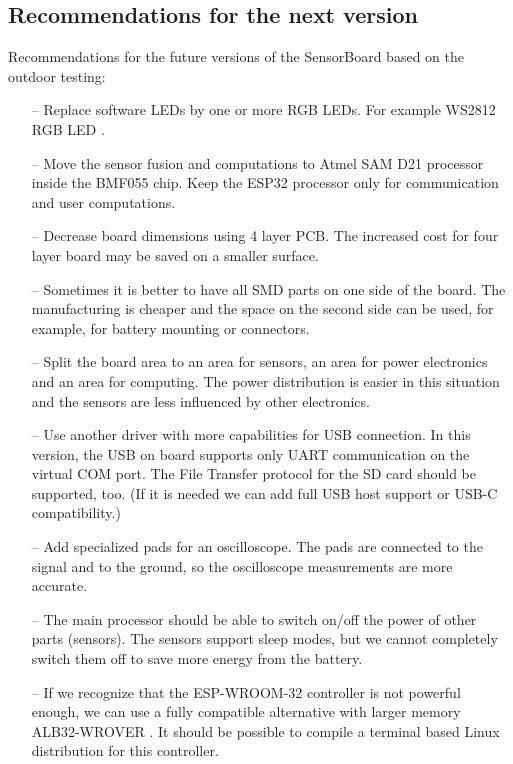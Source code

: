 \subsection{Recommendations for the next version}
\label{recommendationsNextVerison}
Recommendations for the future versions of the SensorBoard based on the outdoor testing:
\begin{itemize}
    \item[--] Replace software LEDs by one or more RGB LEDs. For example WS2812 RGB LED \cite{worldsemi:WS2812}.
    \item[--] Move the sensor fusion and computations to Atmel SAM D21 \cite{atmel:samd20} processor inside the BMF055 \cite{bosch:BMF055} chip. Keep the ESP32 \cite{espressif:ESP-WROOM-32} processor only for communication and user computations.
    \item[--] Decrease board dimensions using 4 layer \ac{PCB}. The increased cost for four layer board may be saved on a smaller surface.
    \item[--] Sometimes it is better to have all \ac{SMD} parts on one side of the board. The manufacturing is cheaper and the space on the second side can be used, for example, for battery mounting or connectors.
    \item[--] Split the board area to an area for sensors, an area for power electronics and an area for computing. The power distribution is easier in this situation and the sensors are less influenced by other electronics.
    \item[--] Use another driver with more capabilities for USB connection. In this version, the USB on board supports only UART communication on the virtual COM port. The File Transfer protocol for the SD card should be supported, too. (If it is needed we can add full USB host support or USB-C compatibility.)
    \item[--] Add specialized pads for an oscilloscope. The pads are connected to the signal and to the ground, so the oscilloscope measurements are more accurate.
    \item[--] The main processor should be able to switch on/off the power of other parts (sensors). The sensors support sleep modes, but we cannot completely switch them off to save more energy from the battery.
    \item[--] If we recognize that the ESP-WROOM-32 controller is not powerful enough, we can use a fully compatible alternative with larger memory ALB32-WROVER \cite{ALB32-WROVER}. It should be possible to compile a terminal based Linux distribution for this controller.
\end{itemize}

